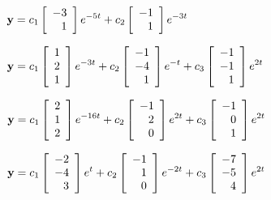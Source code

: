 \smallskip

 ${\bf y}=\displaystyle{c_{1}\left[\begin{array}{r}-3\\1
\end{array}
\right]e^{-5t}+c_{2}\left[\begin{array}{r}-1\\1\end{array}
\right]e^{-3t}}$

\smallskip

 ${\bf y}=\displaystyle{c_{1}\left[\begin{array}{r}1\\2\\1
\end{array}\right]e^{-3t}+c_{2}\left[\begin{array}{r}-1\\-4\\1
\end{array}
\right]e^{-t}+c_{3}\left[\begin{array}{r}-1\\-1\\1\end{array}
\right]e^{2t}}$

\smallskip

 ${\bf y}=\displaystyle{c_{1}\left[\begin{array}{r}2\\1\\2
\end{array}\right]e^{-16t}+c_{2}\left[\begin{array}{r}-1\\2\\
 0\end{array}
\right]e^{2t}+c_{3}\left[\begin{array}{r}-1\\0\\1
\end{array}\right]e^{2t}}$

\smallskip
{}
 ${\bf y}=\displaystyle{c_{1}\left[\begin{array}{r}-2\\-4\\3
\end{array}\right]e^{t}+c_{2}\left[\begin{array}{r}-1\\1\\
 0\end{array}\right]
e^{-2t}+c_{3}\left[\begin{array}{r}-7\\-5\\4\end{array}\right]
e^{2t}}$

